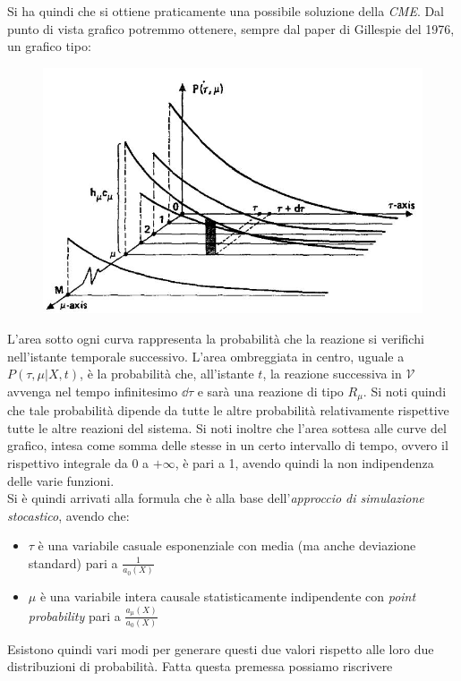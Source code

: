 \documentclass[a4paper,12pt, oneside]{book}
\begin{document}
Si ha quindi che si ottiene praticamente una possibile soluzione della
\textit{CME}. Dal punto di vista grafico potremmo ottenere, sempre dal paper di
Gillespie del 1976, un grafico tipo:
\begin{figure}[H]
  \centering
  \includegraphics[scale = 0.3]{img/gill3.jpg}
\end{figure}
L'area sotto ogni curva rappresenta la probabilità che la reazione si verifichi
nell'istante temporale successivo.  
L'area ombreggiata in centro, uguale a $P(\tau,\mu|X,t)$, è la probabilità
che, all'istante $t$, la reazione successiva in $\mathcal{V}$ avvenga nel tempo
infinitesimo $\dd{\tau}$ e sarà una reazione di tipo $R_\mu$. Si noti quindi che
tale probabilità dipende da tutte le altre probabilità relativamente rispettive
tutte le altre reazioni del sistema. Si noti inoltre che l'area sottesa alle
curve del grafico, intesa come somma delle stesse in un certo intervallo di
tempo, ovvero il rispettivo integrale da 0 a $+\infty$, è pari a 1, 
avendo quindi la non indipendenza delle varie funzioni.\\
Si è quindi arrivati alla formula che è alla base dell'\textit{approccio di
  simulazione stocastico}, avendo che:
\begin{itemize}
  \item $\tau$ è una variabile casuale esponenziale con media (ma anche
  deviazione standard) pari a $\frac{1}{a_0(X)}$
  \item $\mu$ è una variabile intera causale statisticamente indipendente con
  \textit{point probability} pari a $\frac{a_\mu(X)}{a_0(X)}$
\end{itemize}
Esistono quindi vari modi per generare questi due valori rispetto alle loro due
distribuzioni di probabilità. Fatta questa premessa possiamo riscrivere
\end{document}
